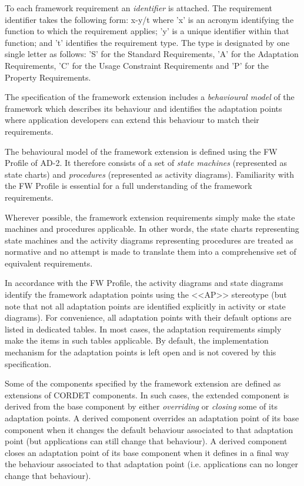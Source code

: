 \documentclass[a4paper,10pt]{article}
\begin{document}
To each framework requirement an \textit{identifier} is attached.
The requirement identifier takes the following form: x-y/t where 'x' is an acronym identifying the function to which the requirement applies; 'y' is a unique identifier within that function; and 't' identifies the requirement type. 
The type is designated by one single letter as follows: 'S' for the Standard Requirements, 'A' for the Adaptation Requirements, 'C' for the Usage Constraint Requirements and 'P' for the Property Requirements.

The specification of the framework extension includes a \textit{behavioural model} of the framework which describes its behaviour and identifies the adaptation points where application developers can extend this behaviour to match their requirements.  

The behavioural model of the framework extension is defined using the FW Profile of AD-2. 
It therefore consists of a set of \textit{state machines} (represented as state charts) and \textit{procedures} (represented as  activity diagrams). 
Familiarity with the FW Profile is essential for a full understanding of the framework requirements.

Wherever possible, the framework extension requirements simply make the state machines and procedures applicable. In other words, the state charts representing state machines and the activity diagrams representing procedures are treated as normative and no attempt is made to translate them into a comprehensive set of equivalent requirements.

In accordance with the FW Profile, the activity diagrams and state diagrams identify the framework adaptation points using the <<AP>> stereotype (but note that not all adaptation points are identified explicitly in activity or state diagrams). 
For convenience, all adaptation points with their default options are listed in dedicated tables. 
In most cases, the adaptation requirements simply make the items in such tables applicable. By default, the implementation mechanism for the adaptation points is left open and is not covered by this specification. 

Some of the components specified by the framework extension are defined as extensions of CORDET components. In such cases, the extended component is derived from the base component by either \textit{overriding} or \textit{closing} some of its adaptation points. 
A derived component overrides an adaptation point of its base component when it changes the default behaviour associated to that adaptation point (but applications can still change that behaviour). 
A derived component closes an adaptation point of its base component when it defines in a final way the behaviour associated to that adaptation point (i.e. applications can no longer change that behaviour).
\end{document}
